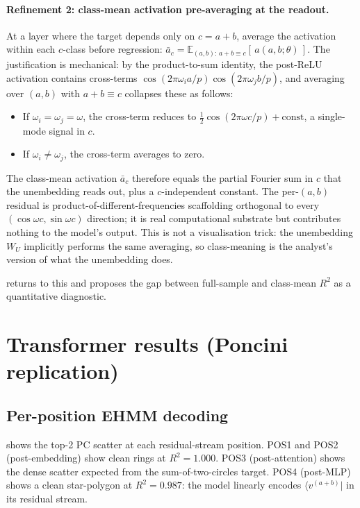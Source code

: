 \documentclass[11pt,a4paper]{article}
\begin{document}
\paragraph{Refinement 2: class-mean activation pre-averaging at the readout.} At a layer where the target depends only on $c = a+b$, average the activation within each $c$-class before regression: $\bar{a}_c = \mathbb{E}_{(a,b):\,a+b\equiv c}[\,a(a,b;\theta)\,]$. The justification is mechanical: by the product-to-sum identity, the post-ReLU activation contains cross-terms $\cos(2\pi\omega_i a/p)\cos(2\pi\omega_j b/p)$, and averaging over $(a, b)$ with $a + b \equiv c$ collapses these as follows:
\begin{itemize}
    \item If $\omega_i = \omega_j = \omega$, the cross-term reduces to $\frac{1}{2}\cos(2\pi\omega c/p) + \text{const}$, a single-mode signal in $c$.
    \item If $\omega_i \neq \omega_j$, the cross-term averages to zero.
\end{itemize}
The class-mean activation $\bar{a}_c$ therefore equals the partial Fourier sum in $c$ that the unembedding reads out, plus a $c$-independent constant. The per-$(a, b)$ residual is product-of-different-frequencies scaffolding orthogonal to every $(\cos\omega c, \sin\omega c)$ direction; it is real computational substrate but contributes nothing to the model's output. This is not a visualisation trick: the unembedding $W_U$ implicitly performs the same averaging, so class-meaning is the analyst's version of what the unembedding does.

 returns to this and proposes the gap between full-sample and class-mean $R^2$ as a quantitative diagnostic.

\section{Transformer results (Poncini replication)}\label{sec:transformer}

\subsection{Per-position EHMM decoding}

 shows the top-2 PC scatter at each residual-stream position. POS1 and POS2 (post-embedding) show clean rings at $R^2 = 1.000$. POS3 (post-attention) shows the dense scatter expected from the sum-of-two-circles target. POS4 (post-MLP) shows a clean star-polygon at $R^2 = 0.987$: the model linearly encodes $\langle v^{(a+b)} |$ in its residual stream.
\end{document}
